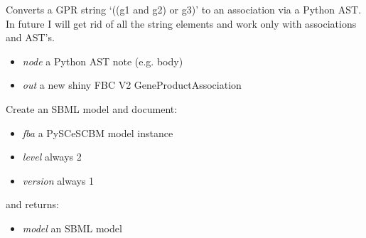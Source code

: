 \documentclass[a4paper,11pt,english]{sphinxmanual}
\begin{document}

\begin{fulllineitems}
\label{modules_doc:cbmpy.CBXML.sbml_createAssociationFromAST}
Converts a GPR string `((g1 and g2) or g3)' to an association via a Python AST.
In future I will get rid of all the string elements and work only with associations
and AST's.
\begin{itemize}
\item {} 
\emph{node} a Python AST note (e.g. body)

\item {} 
\emph{out} a new shiny FBC V2 GeneProductAssociation

\end{itemize}

\end{fulllineitems}


\begin{fulllineitems}
\label{modules_doc:cbmpy.CBXML.sbml_createModelL2}
Create an SBML model and document:
\begin{itemize}
\item {} 
\emph{fba} a PySCeSCBM model instance

\item {} 
\emph{level} always 2

\item {} 
\emph{version} always 1

\end{itemize}

and returns:
\begin{itemize}
\item {} 
\emph{model} an SBML model

\end{itemize}

\end{fulllineitems}

\end{document}
